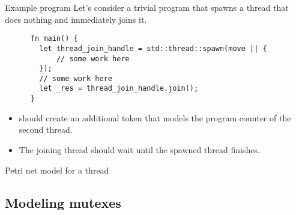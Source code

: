 \documentclass{beamer}
\begin{document}
\begin{frame}[fragile]{Example program}
  Let's consider a trivial program that spawns a thread that does nothing
  and immediately joins it.

  \vfill

  \begin{listing}
    \begin{verbatim}
      fn main() {
        let thread_join_handle = std::thread::spawn(move || {
            // some work here
        });
        // some work here
        let _res = thread_join_handle.join();
      }   
    \end{verbatim}
  \end{listing}

  \vfill
  
  \begin{itemize}
    \item {} should create an additional token
          that models the program counter of the second thread.
    \item The joining thread should wait until the spawned thread finishes.
  \end{itemize}
\end{frame}

\begin{frame}{Petri net model for a thread}
  \begin{figure}
    \centering
    
  \end{figure}
\end{frame}

\subsection{Modeling mutexes}
\end{document}
